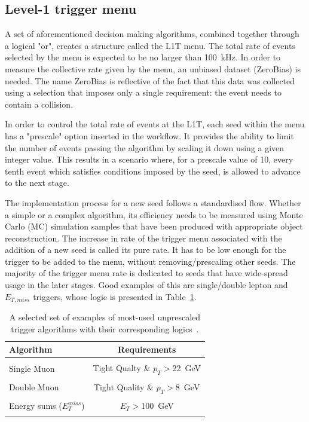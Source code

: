 \subsection{Level-1 trigger menu}

\hspace{10pt} A set of aforementioned decision making algorithms, combined together through a logical "or", creates a structure called the L1T menu. The total rate of events selected by the menu is expected to be no larger than 100~kHz. In order to measure the collective rate given by the menu, an unbiased dataset (ZeroBias) is needed. The name ZeroBias is reflective of the fact that this data was collected using a selection that imposes only a single requirement: the event needs to contain a collision. 

\hspace{10pt}In order to control the total rate of events at the L1T, each seed within the menu has a "prescale" option inserted in the workflow. It provides the ability to limit the number of events passing the algorithm by scaling it down using a given integer value. This results in a scenario where, for a prescale value of 10, every tenth event which satisfies conditions imposed by the seed, is allowed to advance to the next stage. 

\hspace{10pt} The implementation process for a new seed follows a standardised flow. Whether a simple or a complex algorithm, its efficiency needs to be measured using Monte Carlo (MC) simulation samples that have been produced with appropriate object reconstruction. The increase in rate of the trigger menu associated with the addition of a new seed is called its pure rate. It has to be low enough for the trigger to be added to the menu, without removing/prescaling other seeds. The majority of the trigger menu rate is dedicated to seeds that have wide-spread usage in the later stages. Good examples of this are single/double lepton and $E_{T,miss}$ triggers, whose logic is presented in Table~\ref{tab:l1_triggers}. 

\begin{table}[htbp]
    \centering
    \begin{tabular}{lc}
     Algorithm & Requirements \\   \hline\hline
           & \\
      Single Muon   &  Tight Qualty \& $p_T>$22~GeV \\
                 & \\
      Double Muon  &  Tight Quality \& $p_T>$8~GeV  \\
                 & \\
      Energy sums ($E_{T}^{miss}$) & $E_{T}>$100~GeV \\
      & \\\hline\hline
    \end{tabular}
    \caption{A selected set of examples of most-used unprescaled trigger algorithms with their corresponding logics~\cite{cms:l1_paper}.}
    \label{tab:l1_triggers}
\end{table}

